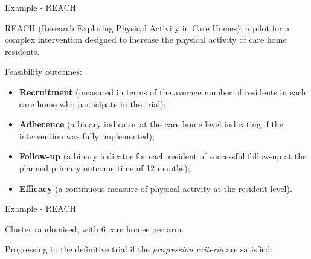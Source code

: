 \documentclass[
  ignorenonframetext,
]{beamer}
\providecommand{\tightlist}{%
  \setlength{\itemsep}{0pt}\setlength{\parskip}{0pt}}
\begin{document}
\begin{frame}{Example - REACH}
\protect\hypertarget{example---reach}{}

REACH (Research Exploring Physical Activity in Care Homes): a pilot for
a complex intervention designed to increase the physical activity of
care home residents.

Feasibility outcomes:

\begin{itemize}
\tightlist
\item
  \textbf{Recruitment} (measured in terms of the average number of
  residents in each care home who participate in the trial);
\item
  \textbf{Adherence} (a binary indicator at the care home level
  indicating if the intervention was fully implemented);
\item
  \textbf{Follow-up} (a binary indicator for each resident of successful
  follow-up at the planned primary outcome time of 12 months);
\item
  \textbf{Efficacy} (a continuous measure of physical activity at the
  resident level).
\end{itemize}

\end{frame}

\begin{frame}{Example - REACH}
\protect\hypertarget{example---reach-1}{}

Cluster randomised, with 6 care homes per arm.

Progressing to the definitive trial if the \emph{progression criteria}
are satisfied:

\end{frame}
\end{document}
